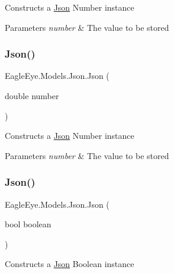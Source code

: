 Constructs a \mbox{\hyperlink{class_eagle_eye_1_1_models_1_1_json}{Json}} Number instance 


\begin{DoxyParams}{Parameters}
{\em number} & The value to be stored\\
\hline
\end{DoxyParams}
\mbox{\label{class_eagle_eye_1_1_models_1_1_json_aeab0ffd54a14d95ef7a275f665ef6d0c}} 
\subsubsection{\texorpdfstring{Json()}{Json()}\hspace{0.1cm}{\footnotesize\ttfamily [3/4]}}
{\footnotesize\ttfamily Eagle\+Eye.\+Models.\+Json.\+Json (\begin{DoxyParamCaption}\item[{double}]{number }\end{DoxyParamCaption})}



Constructs a \mbox{\hyperlink{class_eagle_eye_1_1_models_1_1_json}{Json}} Number instance 


\begin{DoxyParams}{Parameters}
{\em number} & The value to be stored\\
\hline
\end{DoxyParams}
\mbox{\label{class_eagle_eye_1_1_models_1_1_json_ae12564ad6ef249ccd5bbdd57560db23d}} 
\subsubsection{\texorpdfstring{Json()}{Json()}\hspace{0.1cm}{\footnotesize\ttfamily [4/4]}}
{\footnotesize\ttfamily Eagle\+Eye.\+Models.\+Json.\+Json (\begin{DoxyParamCaption}\item[{bool}]{boolean }\end{DoxyParamCaption})}



Constructs a \mbox{\hyperlink{class_eagle_eye_1_1_models_1_1_json}{Json}} Boolean instance 


